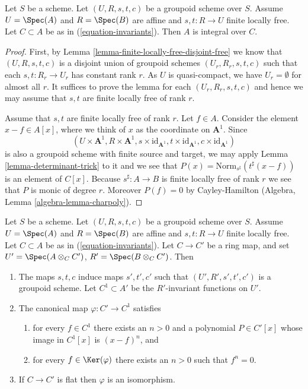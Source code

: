 \begin{lemma}
\label{lemma-integral-over-invariants}
Let $S$ be a scheme. Let $(U, R, s, t, c)$ be a groupoid scheme over $S$.
Assume $U = \Spec(A)$ and $R = \Spec(B)$ are affine and
$s, t : R \to U$ finite locally free.
Let $C \subset A$ be as in (\ref{equation-invariants}).
Then $A$ is integral over $C$.
\end{lemma}

\begin{proof}
First, by Lemma \ref{lemma-finite-locally-free-disjoint-free}
we know that $(U, R, s, t, c)$ is a disjoint union
of groupoid schemes $(U_r, R_r, s, t, c)$ such that each $s, t : R_r \to U_r$
has constant rank $r$. As $U$ is quasi-compact, we have $U_r = \emptyset$ for
almost all $r$. It suffices to prove the lemma for each $(U_r, R_r, s, t, c)$
and hence we may assume that $s, t$ are finite locally free of rank $r$.

\medskip\noindent
Assume that $s, t$ are finite locally free of rank $r$.
Let $f \in A$. Consider the element $x - f \in A[x]$, where we think
of $x$ as the coordinate on $\mathbf{A}^1$.
Since
$$
(U \times \mathbf{A}^1, R \times \mathbf{A}^1,
s \times \text{id}_{\mathbf{A}^1},
t \times \text{id}_{\mathbf{A}^1},
c \times \text{id}_{\mathbf{A}^1})
$$
is also a groupoid scheme with finite source and target, we may apply
Lemma \ref{lemma-determinant-trick} to it and we see that
$P(x) = \text{Norm}_{s^\sharp}(t^\sharp(x - f))$
is an element of $C[x]$. Because $s^\sharp : A \to B$ is finite locally
free of rank $r$ we see that $P$ is monic of degree $r$.
Moreover $P(f) = 0$ by Cayley-Hamilton
(Algebra, Lemma \ref{algebra-lemma-charpoly}).
\end{proof}

\begin{lemma}
\label{lemma-invariants-base-change}
Let $S$ be a scheme. Let $(U, R, s, t, c)$ be a groupoid scheme over $S$.
Assume $U = \Spec(A)$ and $R = \Spec(B)$ are affine and
$s, t : R \to U$ finite locally free. Let $C \subset A$ be as in
(\ref{equation-invariants}). Let $C \to C'$ be a ring map, and set
$U' = \Spec(A \otimes_C C')$,
$R' = \Spec(B \otimes_C C')$.
Then
\begin{enumerate}
\item The maps $s, t, c$ induce maps $s', t', c'$ such that
$(U', R', s', t', c')$ is a groupoid scheme. Let $C^1 \subset A'$
be the $R'$-invariant functions on $U'$.
\item The canonical map $\varphi : C' \to C^1$ satisfies
\begin{enumerate}
\item for every $f \in C^1$ there exists an $n > 0$ and a
polynomial $P \in C'[x]$ whose image in $C^1[x]$ is
$(x - f)^n$, and
\item for every $f \in \Ker(\varphi)$ there exists
an $n > 0$ such that $f^n = 0$.
\end{enumerate}
\item If $C \to C'$ is flat then $\varphi$ is an isomorphism.
\end{enumerate}
\end{lemma}

